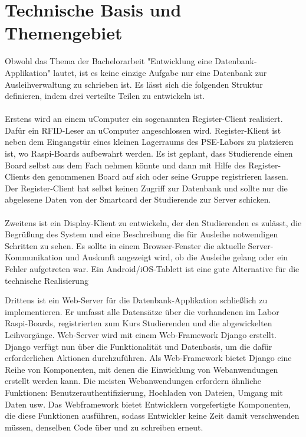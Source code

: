 \section{Technische Basis und Themengebiet}
\label{sec:intro:themengebiet}
Obwohl das Thema der Bachelorarbeit "Entwicklung eine Datenbank-Applikation" lautet, ist es keine einzige Aufgabe nur eine Datenbank zur Ausleihverwaltung zu schrieben ist. Es lässt sich die folgenden Struktur definieren, indem drei verteilte Teilen zu entwickeln ist.\\\\
Erstens wird an einem uComputer ein sogenannten Register-Client realisiert. Dafür ein RFID-Leser an uComputer angeschlossen wird. Register-Klient ist neben dem Eingangstür eines kleinen Lagerraums des PSE-Labors zu platzieren ist, wo Raspi-Boards aufbewahrt werden. Es ist geplant, dass Studierende einen Board selbst aus dem Fach nehmen könnte und dann mit Hilfe des Register-Clients den genommenen Board auf sich oder seine Gruppe registrieren lassen. Der Register-Client hat selbst keinen Zugriff zur Datenbank und sollte nur die abgelesene Daten von der Smartcard der Studierende zur Server schicken. \\\\
Zweitens ist ein Display-Klient zu entwickeln, der den Studierenden es zulässt, die Begrüßung des System und eine Beschreibung die für Ausleihe notwendigen Schritten zu sehen. Es sollte in einem Browser-Fenster die aktuelle Server-Kommunikation und Auskunft angezeigt wird, ob die Ausleihe gelang oder ein Fehler aufgetreten war. Ein Android/iOS-Tablett ist eine gute Alternative für die technische Realisierung 

Drittens ist ein Web-Server für die Datenbank-Applikation schließlich zu implementieren. Er umfasst alle Datensätze über die vorhandenen im Labor Raspi-Boards, registrierten zum Kurs Studierenden und die abgewickelten Leihvorgänge.  Web-Server wird mit einem Web-Framework Django erstellt.  Django verfügt nun über die Funktionalität und Datenbasis, um die dafür erforderlichen Aktionen durchzuführen. Als Web-Framework bietet Django eine Reihe von Komponenten, mit denen die Einwicklung von Webanwendungen erstellt werden kann. Die meisten Webanwendungen erfordern ähnliche Funktionen: Benutzerauthentifizierung, Hochladen von Dateien, Umgang mit Daten usw. Das Webframework bietet Entwicklern vorgefertigte Komponenten, die diese Funktionen ausführen, sodass Entwickler keine Zeit damit verschwenden müssen, denselben Code über und zu schreiben erneut.


